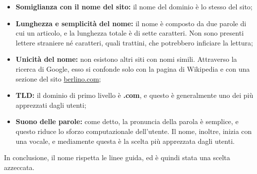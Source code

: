 \begin{itemize}
\item \textbf{Somiglianza con il nome del sito:} il nome del dominio è lo stesso del sito;
\item \textbf{Lunghezza e semplicità del nome:} il nome è composto da due parole di cui un articolo, e la lunghezza totale è di sette caratteri. Non sono presenti lettere straniere né caratteri, quali trattini, che potrebbero inficiare la lettura;
\item \textbf{Unicità del nome:} non esistono altri siti con nomi simili. Attraverso la ricerca di Google, esso si confonde solo con la pagina di Wikipedia e con una sezione del sito \href{http://www.berlino.com}{berlino.com};
\item \textbf{TLD:} il dominio di primo livello è \textbf{.com}, e questo è generalmente uno dei più apprezzati dagli utenti;
\item \textbf{Suono delle parole:} come detto, la pronuncia della parola è semplice, e questo riduce lo sforzo computazionale dell'utente. Il nome, inoltre, inizia con una vocale, e mediamente questa è la scelta più apprezzata dagli utenti.
\end{itemize}
In conclusione, il nome rispetta le linee guida, ed è quindi stata una scelta azzeccata.